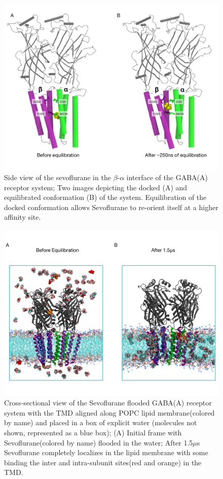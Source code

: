 \documentclass[12pt]{article}
\begin{document}
\begin{figure}
\begin{center}
\centering
\includegraphics[width = 1\textwidth]{finlpics/Figure_6}
\caption{Side view of the sevoflurane in the $\beta$-$\alpha$ interface of the GABA(A) receptor system; Two images depicting the docked (A) and equilibrated conformation (B) of the system. Equilibration of the docked conformation allows Sevoflurane to re-orient itself at a higher affinity site.}
\label{fig:sevMD}
\end{center}
\end{figure}


\begin{figure}
\begin{center}
\centering
\includegraphics[width = 1\textwidth]{finlpics/Figure_7}
\caption{Cross-sectional view of the Sevoflurane flooded GABA(A) receptor system with the TMD aligned along POPC lipid membrane(colored by name) and placed in a box of explicit water (molecules not shown, represented as a blue box); (A) Initial frame with Sevoflurane(colored by name) flooded in the water; After  1.5$\mu$s  Sevoflurane completely localizes in the lipid membrane with some binding the inter and intra-subunit sites(red and orange) in the TMD.}
\label{fig:sevFlood}
\end{center}
\end{figure} 
\end{document}
